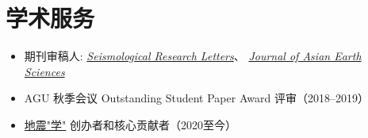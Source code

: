 \section{学术服务}

\begin{itemize}
\item 期刊审稿人:
      \textit{\href{https://pubs.geoscienceworld.org/srl/}{Seismological Research Letters}}、
      \textit{\href{https://www.journals.elsevier.com/journal-of-asian-earth-sciences/}{Journal of Asian Earth Sciences}}
\item AGU 秋季会议 Outstanding Student Paper Award 评审（2018--2019）
\item \href{https://seismo-learn.org/}{地震"学"} 创办者和核心贡献者（2020至今）
\end{itemize}
